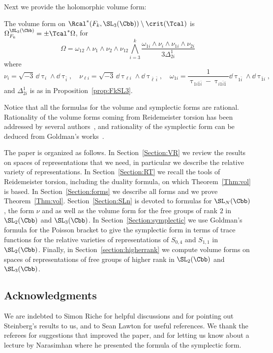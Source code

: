 Next we provide the holomorphic volume form:

\begin{theo}\label{thm:FkSL3}
The volume form on $\Rcal^*(F_k,\SL_3(\Cbb))\setminus \crit(\Tcal)$ is $ \Omega_{F_k}^{\SL_3(\Cbb)}=\pm \Tcal^* \Omega$, for
\[
\Omega =\omega_{12}\wedge\nu_1\wedge\nu_2\wedge\nu_{12}\bigwedge_{i=3}^k\frac{\omega_{1i}\wedge \nu_i\wedge \nu_{1i}\wedge \nu_{2i} }{3 \varDelta^1_{2i}}
\]
where
\[
\nu_i = \sqrt{-3}\, \dd \uptau_i\wedge \dd \uptau_{\bar i}, \quad
\nu_{\ell i} = \sqrt{-3}\, \dd \uptau_{\ell i}\wedge \dd \uptau_{\bar\ell \, \bar i}, \quad
\omega_{1i} = \frac1{ {\uptau_{1i\bar 1\bar i}- \uptau_{i1\bar i\bar 1} } } {\dd \uptau_{1\bar i}\wedge \dd \uptau_{\bar 1 i} },
\]
and $ \varDelta^1_{2i}$ is as in Proposition~\ref{prop:FkSL3}.
\end{theo}


\begin{rema}
Notice that all the formulas for the volume and symplectic forms are rational. Rationality of the volume forms coming from Reidemeister torsion has been addressed by several authors~\cite{Benard1, Benard2, DuboisGaroufalidis, Marche2016, Porti}, and rationality of the symplectic form can be deduced from Goldman's works~\cite{GoldmanHamiltonian,GoldmanComplex}.
\end{rema}



The paper is organized as follows. In Section~\ref{Section:VR} we review the results on spaces of representations that we need, in particular we describe the relative variety of representations. In Section~\ref{Section:RT} we recall the tools of Reidemeister torsion, including the duality formula, on which Theorem~\ref{Thm:vol} is based. In Section~\ref{Section:forms} we describe all forms and we prove Theorem~\ref{Thm:vol}. Section~\ref{Section:SLn} is devoted to formulas for $\SL_N (\Cbb)$, the form $\nu$ and as well as the volume form for the free groups of rank $2$ in $\SL_2(\Cbb)$ and $\SL_3(\Cbb)$. In Section~\ref{Section:symplectic} we use Goldman's formula for the Poisson bracket to give the symplectic form in terms of trace functions for the relative varieties of representations of $S_{0,4}$ and $S_{1,1}$ in $\SL_2(\Cbb)$. Finally, in Section~\ref{section:higherrank} we compute volume forms on spaces of representations of free groups of higher rank in $\SL_2(\Cbb)$ and $\SL_3(\Cbb)$.


\subsection*{Acknowledgments}%
We are indebted to Simon Riche for helpful discussions and for pointing out Steinberg's results to us, and to Sean Lawton for useful references. We thank the referees for suggestions that improved the paper, and for letting us know about a lecture by Narasimhan where he presented the formula of the symplectic form.


